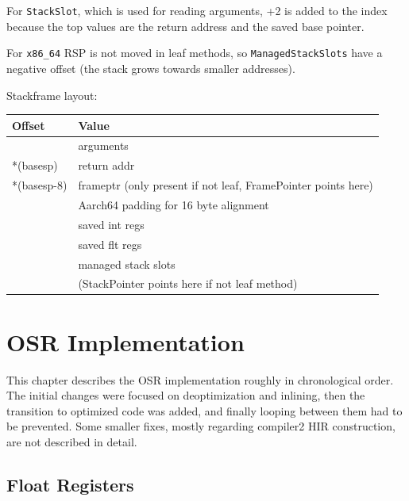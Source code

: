 \documentclass[draft,final]{vutinfth} %
\begin{document}
    For \lstinline{StackSlot}, which is used for reading arguments, +2 is added to the index because the top values are the return address and the saved base pointer.

    For \texttt{x86\_64} RSP is not moved in leaf methods, so \lstinline{ManagedStackSlots} have a negative offset (the stack grows towards smaller addresses).

    Stackframe layout:

    \begin{tabular}{ll}
        \toprule
        \textbf{Offset} & \textbf{Value}                                                \\
        \midrule
        & arguments \\
        *(basesp)       & return addr                                                   \\
        *(basesp-8)     & frameptr (only present if not leaf, FramePointer points here) \\
        & Aarch64 padding for 16 byte alignment                         \\
        & saved int regs                                                \\
        & saved flt regs                                                \\
        & managed stack slots                                           \\
        & (StackPointer points here if not leaf method)                 \\
        \bottomrule
    \end{tabular}


    \chapter{OSR Implementation}

    This chapter describes the OSR implementation
    roughly in chronological order.
    The initial changes were focused on deoptimization and inlining,
    then the transition to optimized code was added,
    and finally looping between them had to be prevented.
    Some smaller fixes,
    mostly regarding compiler2 HIR construction,
    are not described in detail.


    \section{Float Registers}
\end{document}
